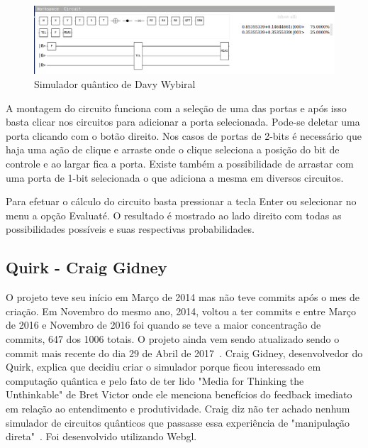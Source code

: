 \documentclass[a4paper, 12pt, oneside]{book}
\begin{document}
\begin{figure}[hbtp]
\centering
\includegraphics[scale=0.36]{davyw.jpg}
\caption{Simulador quântico de Davy Wybiral}
\end{figure}

A montagem do circuito funciona com a seleção de uma das portas e após isso basta clicar nos circuitos para adicionar a porta selecionada. Pode-se deletar uma porta clicando com o botão direito. Nos casos de portas de 2-bits é necessário que haja uma ação de clique e arraste onde o clique seleciona a posição do bit de controle e ao largar fica a porta. Existe também a possibilidade de arrastar com uma porta de 1-bit selecionada o que adiciona a mesma em diversos circuitos.

Para efetuar o cálculo do circuito basta pressionar a tecla Enter ou selecionar no menu a opção Evaluaté. O resultado é mostrado ao lado direito com todas as possibilidades possíveis e suas respectivas probabilidades.

\subsection{Quirk - Craig Gidney}

O projeto teve seu início em Março de 2014 mas não teve commits após o mes de criação. Em Novembro do mesmo ano, 2014, voltou a ter commits e entre Março de 2016 e Novembro de 2016 foi quando se teve a maior concentração de commits, 647 dos 1006 totais. O projeto ainda vem sendo atualizado sendo o commit mais recente do dia 29 de Abril de 2017~\cite{gitquirk}. Craig Gidney, desenvolvedor do Quirk, explica que decidiu criar o simulador porque ficou interessado em computação quântica e pelo fato de ter lido "Media for Thinking the Unthinkable" de Bret Victor onde ele menciona benefícios do feedback imediato em relação ao entendimento e produtividade. Craig diz não ter achado nenhum simulador de circuitos quânticos que passasse essa experiência de "manipulação direta"~\cite{quirk}. Foi desenvolvido utilizando Webgl.
\end{document}
